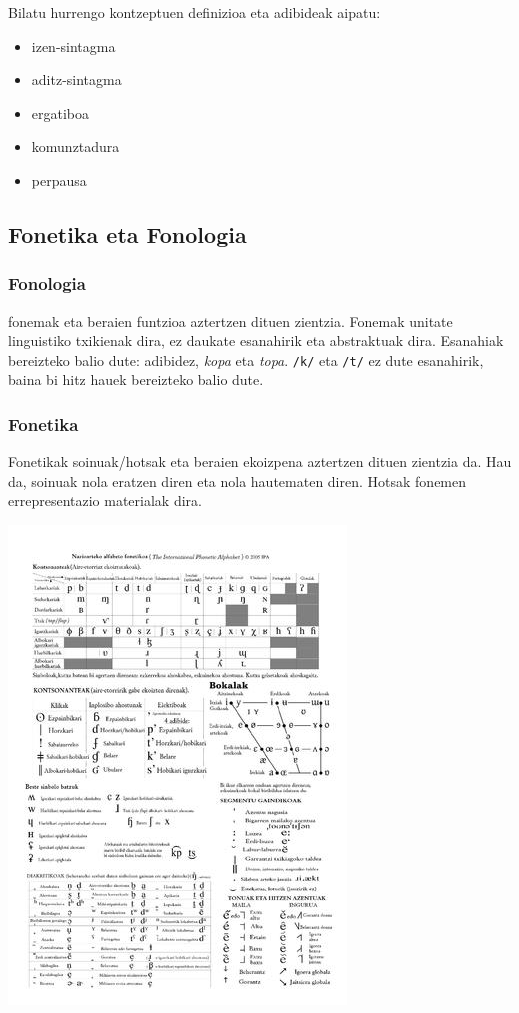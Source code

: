\documentclass[
]{book}
\providecommand{\tightlist}{%
  \setlength{\itemsep}{0pt}\setlength{\parskip}{0pt}}
\begin{document}
Bilatu hurrengo kontzeptuen definizioa eta adibideak aipatu:

\begin{itemize}
\tightlist
\item
  izen-sintagma
\item
  aditz-sintagma
\item
  ergatiboa
\item
  komunztadura
\item
  perpausa
\end{itemize}

\hypertarget{fonetika-eta-fonologia}{%
\subsection{Fonetika eta Fonologia}\label{fonetika-eta-fonologia}}

\hypertarget{fonologia}{%
\subsubsection{Fonologia}\label{fonologia}}

fonemak eta beraien funtzioa aztertzen dituen zientzia. Fonemak unitate linguistiko txikienak dira, ez daukate esanahirik eta abstraktuak dira.
Esanahiak bereizteko balio dute: adibidez, \emph{kopa} eta \emph{topa}. \texttt{/k/} eta \texttt{/t/} ez dute esanahirik, baina bi hitz hauek bereizteko balio dute.

\hypertarget{fonetika}{%
\subsubsection{Fonetika}\label{fonetika}}

Fonetikak soinuak/hotsak eta beraien ekoizpena aztertzen dituen zientzia da. Hau da, soinuak nola eratzen diren eta nola hautematen diren.
Hotsak fonemen errepresentazio materialak dira.

\href{https://upload.wikimedia.org/wikipedia/commons/9/92/International_Phonetic_Alphabet_translated_into_basque_Nazioarteko_alfabeto_fonetikoa_eu.pdf}{\includegraphics{assets/img/IPA(tx)_eu.pdf.jpg}}
\end{document}
